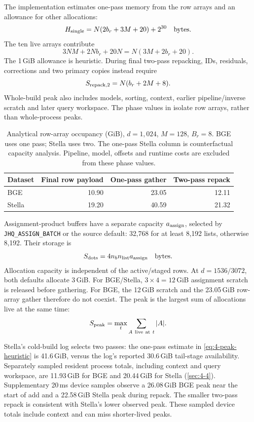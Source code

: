 The implementation estimates one-pass memory from the row arrays and
an allowance for other allocations:
\begin{equation}
 H_{\rm single}=N(2b_r+3M+20)+2^{30}\quad\text{bytes}.
 \label{eq:4-peak-heuristic}
\end{equation}
The ten live arrays contribute
\[
 3NM+2Nb_r+20N=N(3M+2b_r+20).
\]
The 1\,GiB allowance is heuristic. During final two-pass repacking,
IDs, residuals, corrections and two primary copies instead require
\begin{equation}
 S_{\rm repack,2}=N(b_r+2M+8).
 \label{eq:4-two-pass-repack}
\end{equation}
Whole-build peak also includes models, sorting, context, earlier
pipeline/inverse scratch and later query workspace. The phase values in
 isolate row arrays, rather than whole-process
peaks.

\begin{table}[!htbp]
\centering
\caption[Analytical row-array occupancy by construction phase]{Analytical row-array occupancy (GiB), $d=1{,}024$, $M=128$,
$B_r=8$. BGE uses one pass; Stella uses two. The one-pass Stella column
is counterfactual capacity analysis. Pipeline, model, offsets and runtime
costs are excluded from these phase values.}
\label{tab:4-phase-storage}
\small
\begin{tabular}{@{}lrrr@{}}
\toprule
Dataset & Final row payload & One-pass gather & Two-pass repack \\
\midrule
BGE & 10.90 & 23.05 & 12.11 \\
Stella & 19.20 & 40.59 & 21.32 \\
\bottomrule
\end{tabular}
\end{table}

Assignment-product buffers have a separate capacity $a_{\rm assign}$,
selected by \texttt{JHQ\_ASSIGN\_BATCH} or the source default: 32,768
for at least 8,192 lists, otherwise 8,192. Their storage is
\begin{equation}
 S_{\rm dots}=4n_b n_{\rm list}a_{\rm assign}\quad\text{bytes}.
 \label{eq:4-assignment-scratch}
\end{equation}
Allocation capacity is independent of the active/staged rows. At
$d=1536/3072$, both defaults allocate 3\,GiB. For BGE/Stella,
$3\times4=12$\,GiB assignment scratch is released before gathering.
For BGE, the 12\,GiB scratch and the 23.05\,GiB row-array gather therefore do not coexist. The peak is
the largest sum of allocations live at the same time:
\[
 S_{\rm peak}=\max_t\sum_{A\ {\rm live\ at}\ t}|A|.
\]



Stella's cold-build log selects two passes: the one-pass estimate in
\cref{eq:4-peak-heuristic} is 41.6\,GiB, versus the log's reported
30.6\,GiB tail-stage availability. Separately sampled resident process
totals, including context and query workspace, are 11.93\,GiB for BGE
and 20.44\,GiB for Stella (\cref{sec:4-4}). Supplementary 20\,ms device
samples observe a 26.08\,GiB BGE peak near the start of add and a
22.58\,GiB Stella peak during repack. The smaller two-pass repack is
consistent with Stella's lower observed peak. These sampled device
totals include context and can miss shorter-lived peaks.
